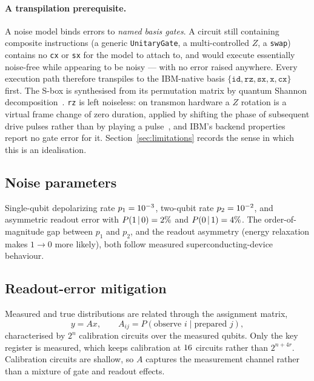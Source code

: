 \documentclass[11pt,a4paper]{article}
\begin{document}
\paragraph{A transpilation prerequisite.} A noise model binds errors to
\emph{named basis gates}. A circuit still containing composite instructions
(a generic \texttt{UnitaryGate}, a multi-controlled $Z$, a \texttt{swap})
contains no \texttt{cx} or \texttt{sx} for the model to attach to, and would
execute essentially noise-free while appearing to be noisy --- with no error
raised anywhere. Every execution path therefore transpiles to the IBM-native
basis $\{\texttt{id}, \texttt{rz}, \texttt{sx}, \texttt{x}, \texttt{cx}\}$
first. The S-box is synthesised from its permutation matrix by quantum Shannon
decomposition~\citep{shende2006}. \texttt{rz} is left noiseless: on transmon
hardware a $Z$ rotation is a virtual frame change of zero duration, applied by
shifting the phase of subsequent drive pulses rather than by playing a
pulse~\citep{mckay2017}, and IBM's backend properties report no gate error for
it. Section~\ref{sec:limitations} records the sense in which this is an
idealisation.

\subsection{Noise parameters}

Single-qubit depolarizing rate $p_1 = 10^{-3}$, two-qubit rate
$p_2 = 10^{-2}$, and asymmetric readout error with
$P(1\,|\,0) = 2\%$ and $P(0\,|\,1) = 4\%$. The
order-of-magnitude gap between $p_1$ and $p_2$, and the readout asymmetry
(energy relaxation makes $1 \to 0$ more likely), both follow measured
superconducting-device behaviour.

\subsection{Readout-error mitigation}

Measured and true distributions are related through the assignment matrix,
\begin{equation}
  y = A x, \qquad A_{ij} = P(\text{observe } i \mid \text{prepared } j),
\end{equation}
characterised by $2^{n}$ calibration circuits over the measured qubits. Only
the key register is measured, which keeps calibration at
$16$ circuits rather than $2^{n+4r}$. Calibration circuits
are shallow, so $A$ captures the measurement channel rather than a mixture of
gate and readout effects.
\end{document}
